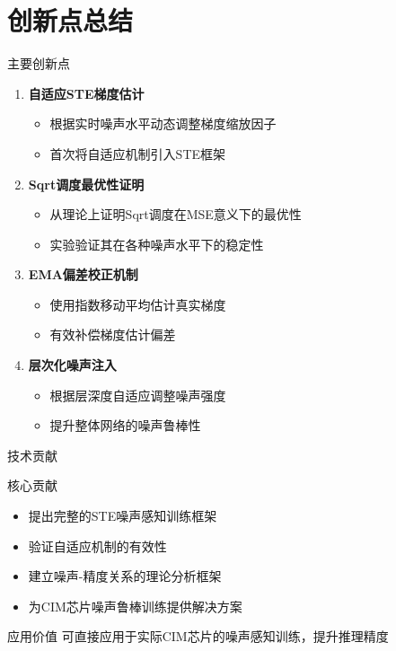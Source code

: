 \documentclass[aspectratio=169]{beamer}
\begin{document}
\section{创新点总结}
\begin{frame}{主要创新点}
\begin{enumerate}
\item \textbf{自适应STE梯度估计}
\begin{itemize}
\item 根据实时噪声水平动态调整梯度缩放因子
\item 首次将自适应机制引入STE框架
\end{itemize}
\vfill
\item \textbf{Sqrt调度最优性证明}
\begin{itemize}
\item 从理论上证明Sqrt调度在MSE意义下的最优性
\item 实验验证其在各种噪声水平下的稳定性
\end{itemize}
\vfill
\item \textbf{EMA偏差校正机制}
\begin{itemize}
\item 使用指数移动平均估计真实梯度
\item 有效补偿梯度估计偏差
\end{itemize}
\vfill
\item \textbf{层次化噪声注入}
\begin{itemize}
\item 根据层深度自适应调整噪声强度
\item 提升整体网络的噪声鲁棒性
\end{itemize}
\end{enumerate}
\end{frame}

\begin{frame}{技术贡献}
\begin{block}{核心贡献}
\begin{itemize}
\item 提出完整的STE噪声感知训练框架
\item 验证自适应机制的有效性
\item 建立噪声-精度关系的理论分析框架
\item 为CIM芯片噪声鲁棒训练提供解决方案
\end{itemize}
\end{block}
\vfill
\begin{block}{应用价值}
可直接应用于实际CIM芯片的噪声感知训练，提升推理精度
\end{block}
\end{frame}
\end{document}
